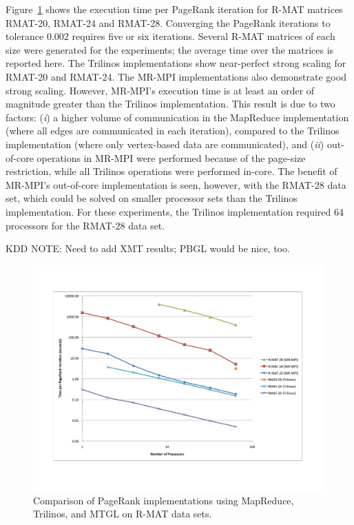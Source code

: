 Figure~\ref{fig:pr} shows the execution time per PageRank iteration for
R-MAT matrices RMAT-20, RMAT-24 and RMAT-28.  
Converging the PageRank iterations
to tolerance $0.002$ requires five or six iterations.
Several R-MAT matrices of 
each size were generated for the experiments; the average time over the
matrices is reported here.  
The Trilinos implementations show near-perfect
strong scaling for RMAT-20 and RMAT-24.  The MR-MPI 
implementations also demonstrate good strong scaling.  However, MR-MPI's
execution time is at least an order of magnitude greater than the Trilinos
implementation.  This result is due to two factors:  ({\it i}) a 
higher volume of
communication in the MapReduce implementation (where all edges are communicated
in each iteration), compared to the Trilinos implementation (where only
vertex-based data are communicated), and ({\it ii}) out-of-core operations
in MR-MPI were performed because of the page-size restriction, while all
Trilinos operations were performed in-core.  The benefit of MR-MPI's
out-of-core implementation is seen, however, with the RMAT-28 data set, 
which could be solved on smaller processor sets than the Trilinos 
implementation.  For these experiments, the Trilinos implementation required
64 processors for the RMAT-28 data set. 

KDD NOTE:  Need to add XMT results; PBGL would be nice, too.


\begin{figure}[h!]
\includegraphics[width=\textwidth]{fig_pagerank.pdf}
\caption{Comparison of PageRank implementations using MapReduce,
Trilinos, and MTGL on R-MAT data sets.}
\label{fig:pr}
\end{figure}



